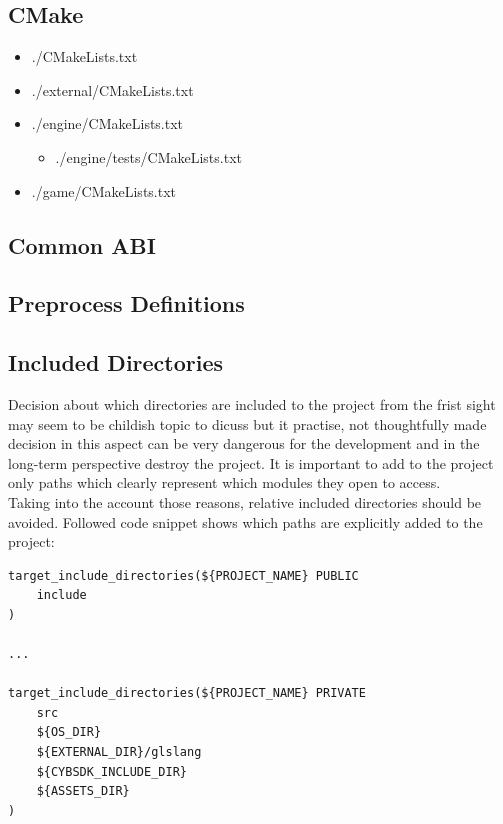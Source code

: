 \subsection{CMake}
\begin{itemize}
    \item ./CMakeLists.txt
    \item ./external/CMakeLists.txt
    \item ./engine/CMakeLists.txt
        \begin{itemize}
            \item ./engine/tests/CMakeLists.txt
        \end{itemize}
    \item ./game/CMakeLists.txt
\end{itemize}

\subsection{Common ABI}
\label{sec:abi}

\subsection{Preprocess Definitions}

\subsection{Included Directories}
Decision about which directories are included to the project from the frist sight may seem to be childish topic to dicuss but it practise, not thoughtfully made decision in this aspect can be very dangerous for the development and in the long-term perspective destroy the project. It is important to add to the project only paths which clearly represent which modules they open to access.\\
Taking into the account those reasons, relative included directories should be avoided.
Followed code snippet shows which paths are explicitly added to the project:
\label{lst:exp_incl}
\begin{lstlisting}[caption=Explicitly included directories (./engine/CMakeLists.txt)]
target_include_directories(${PROJECT_NAME} PUBLIC
    include
)

...

target_include_directories(${PROJECT_NAME} PRIVATE
    src
    ${OS_DIR}
    ${EXTERNAL_DIR}/glslang
    ${CYBSDK_INCLUDE_DIR}
    ${ASSETS_DIR}
)
\end{lstlisting}


